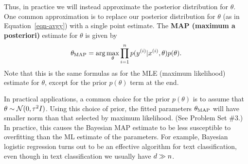\documentclass{article}
\begin{document}
Thus, in practice we will instead approximate the 
posterior distribution for $\theta$.
One common approximation is to replace our posterior distribution for $\theta$
(as in Equation~\ref{eqn-avgy}) with a single point estimate.  The {\bf MAP (maximum a posteriori)}
estimate for $\theta$ is given by 
\begin{equation}
\theta_{\rm MAP} = \arg \max_\theta \prod_{i=1}^{n} p({y^{(i)}} | {x^{(i)}}, \theta) p(\theta).
\end{equation}
Note that this is the same formulas as for the MLE (maximum likelihood) estimate for $\theta$,
except for the prior $p(\theta)$ term at the end.  

In practical applications, a common choice for the prior $p(\theta)$ is to assume 
that $\theta \sim {\cal N}(0, \tau^2 I)$.   Using this choice of prior, the 
fitted parameters $\theta_{\rm MAP}$ will have smaller norm than that 
selected by maximum likelihood.
(See Problem Set \#3.)  
In practice, this causes the Bayesian MAP estimate to be less
susceptible to overfitting than the ML estimate of the parameters.  For example,
Bayesian logistic regression turns out to be an effective algorithm for 
text classification, even though in text classification we usually have ${d} \gg {n}$. 
\end{document}

